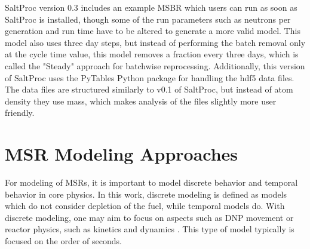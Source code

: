 SaltProc version 0.3 includes an example MSBR which users can run as soon as SaltProc is installed, though some of the run parameters such as neutrons per generation and run time have to be altered to generate a more valid model.
This model also uses three day steps, but instead of performing the batch removal only at the cycle time value, this model removes a fraction every three days, which is called the "Steady" approach for batchwise reprocessing.
Additionally, this version of SaltProc uses the PyTables Python package for handling the hdf5 data files. The data files are structured similarly to v0.1 of SaltProc, but instead of atom density they use mass, which makes analysis of the files slightly more user friendly.







\section{MSR Modeling Approaches}
\label{s:models-methods}

For modeling of MSRs, it is important to model discrete behavior and temporal behavior in core physics.
In this work, discrete modeling is defined as models which do not consider depletion of the fuel, while temporal models do.
With discrete modeling, one may aim to focus on aspects such as DNP movement \cite{fei_molten_2020, shi_gen-foam_2021} or reactor physics, such as kinetics and dynamics \cite{singh_plant-level_2020, cervi_development_2019, aufiero_development_2014, cui_development_2022, singh_dynamics_2017}.
This type of model typically is focused on the order of seconds.

